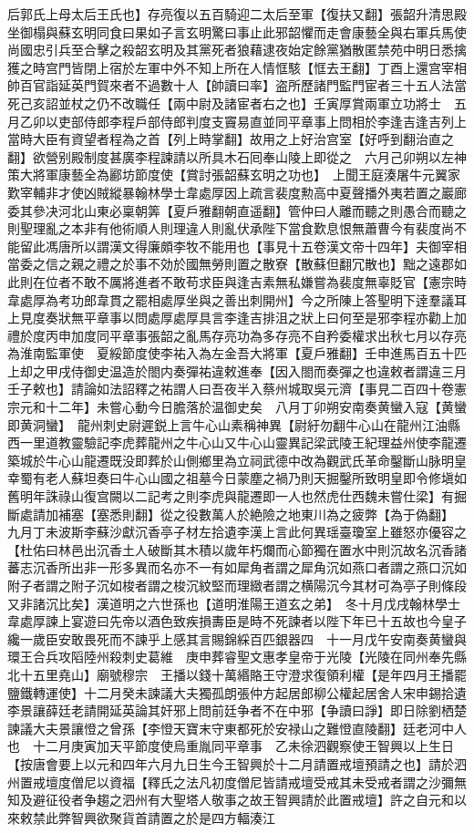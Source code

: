 后郭氏上母太后王氏也】存亮復以五百騎迎二太后至軍【復扶又翻】張韶升清思殿坐御榻與蘇玄明同食曰果如子言玄明驚曰事止此邪韶懼而走會康藝全與右軍兵馬使尚國忠引兵至合擊之殺韶玄明及其黨死者狼藉逮夜始定餘黨猶散匿禁苑中明日悉擒獲之時宫門皆閉上宿於左軍中外不知上所在人情恇駭【恇去王翻】丁酉上還宫宰相帥百官詣延英門賀來者不過數十人【帥讀曰率】盗所歷諸門監門宦者三十五人法當死己亥詔並杖之仍不改職任【兩中尉及諸宦者右之也】壬寅厚賞兩軍立功將士　五月乙卯以吏部侍郎李程戶部侍郎判度支竇易直並同平章事上問相於李逢吉逢吉列上當時大臣有資望者程為之首【列上時掌翻】故用之上好治宫室【好呼到翻治直之翻】欲營别殿制度甚廣李程諫請以所具木石囘奉山陵上即從之　六月己卯朔以左神策大將軍康藝全為酈坊節度使【賞討張韶蘇玄明之功也】　上聞王庭湊屠牛元翼家歎宰輔非才使凶賊縱暴翰林學士韋處厚因上疏言裴度勲高中夏聲播外夷若置之巖廊委其參决河北山東必稟朝筭【夏戶雅翻朝直遥翻】管仲曰人離而聽之則愚合而聽之則聖理亂之本非有他術順人則理違人則亂伏承陛下當食歎息恨無蕭曹今有裴度尚不能留此馮唐所以謂漢文得廉頗李牧不能用也【事見十五卷漢文帝十四年】夫御宰相當委之信之親之禮之於事不効於國無勞則置之散寮【散蘇但翻冗散也】黜之遠郡如此則在位者不敢不厲將進者不敢苟求臣與逢吉素無私嫌嘗為裴度無辜貶官【憲宗時韋處厚為考功郎韋貫之罷相處厚坐與之善出刺開州】今之所陳上答聖明下逹羣議耳上見度奏狀無平章事以問處厚處厚具言李逢吉排沮之狀上曰何至是邪李程亦勸上加禮於度丙申加度同平章事張韶之亂馬存亮功為多存亮不自矜委權求出秋七月以存亮為淮南監軍使　夏綏節度使李祐入為左金吾大將軍【夏戶雅翻】壬申進馬百五十匹上却之甲戌侍御史温造於閤内奏彈祐違敕進奉【因入閤而奏彈之也違敕者謂違三月壬子敕也】請論如法詔釋之祐謂人曰吾夜半入蔡州城取吳元濟【事見二百四十卷憲宗元和十二年】未嘗心動今日膽落於温御史矣　八月丁卯朔安南奏黄蠻入寇【黄蠻即黄洞蠻】　龍州刺史尉遲鋭上言牛心山素稱神異【尉紆勿翻牛心山在龍州江油縣西一里道教靈驗記李虎葬龍州之牛心山又牛心山靈異記梁武陵王紀理益州使李龍遷築城於牛心山龍遷既没即葬於山側鄉里為立祠武德中改為觀武氏革命鑿斷山脉明皇幸蜀有老人蘇坦奏曰牛心山國之祖墓今日蒙塵之禍乃則天掘鑿所致明皇即令修塡如舊明年誅祿山復宫闕以二記考之則李虎與龍遷即一人也然虎仕西魏未嘗仕梁】有掘斷處請加補塞【塞悉則翻】從之役數萬人於絶險之地東川為之疲弊【為于偽翻】　九月丁未波斯李蘇沙獻沉香亭子材左拾遺李漢上言此何異瑶臺瓊室上雖怒亦優容之【杜佑曰林邑出沉香土人破斷其木積以歲年朽爛而心節獨在置水中則沉故名沉香諸蕃志沉香所出非一形多異而名亦不一有如犀角者謂之犀角沉如燕口者謂之燕口沉如附子者謂之附子沉如梭者謂之梭沉紋堅而理緻者謂之横陽沉今其材可為亭子則條段又非諸沉比矣】漢道明之六世孫也【道明淮陽王道玄之弟】　冬十月戊戌翰林學士韋處厚諫上宴遊曰先帝以酒色致疾損夀臣是時不死諫者以陛下年已十五故也今皇子纔一歲臣安敢畏死而不諫乎上感其言賜錦綵百匹銀器四　十一月戊午安南奏黄蠻與環王合兵攻䧟陸州殺刺史葛維　庚申葬睿聖文惠孝皇帝于光陵【光陵在同州奉先縣北十五里堯山】廟號穆宗　王播以錢十萬緡賂王守澄求復領利權【是年四月王播罷鹽鐵轉運使】十二月癸未諫議大夫獨孤朗張仲方起居郎柳公權起居舍人宋申錫拾遺李景讓薛廷老請開延英論其奸邪上問前廷争者不在中邪【争讀曰諍】即日除劉栖楚諫議大夫景讓憕之曾孫【李憕天寶末守東都死於安禄山之難憕直陵翻】廷老河中人也　十二月庚寅加天平節度使烏重胤同平章事　乙未徐泗觀察使王智興以上生日【按唐會要上以元和四年六月九日生今王智興於十二月請置戒壇預請之也】請於泗州置戒壇度僧尼以資福【釋氏之法凡初度僧尼皆請戒壇受戒其未受戒者謂之沙彌無知及避征役者争趨之泗州有大聖塔人敬事之故王智興請於此置戒壇】許之自元和以來敕禁此弊智興欲聚貨首請置之於是四方輻湊江